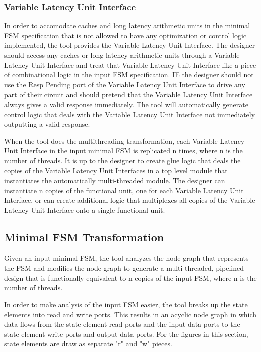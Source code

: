 \subsubsection{Variable Latency Unit Interface}
In order to accomodate caches and long latency arithmetic units in the minimal FSM specification that is not allowed to have any optimization or control logic implemented, the tool provides the Variable Latency Unit Interface. The designer should access any caches or long latency arithmetic units through a Variable Latency Unit Interface and treat that Variable Latency Unit Interface like a piece of combinational logic in the input FSM specification. IE the designer should not use the Resp Pending port of the Variable Latency Unit Interface to drive any part of their circuit and should pretend that the Variable Latency Unit Interface always gives a valid response immediately. The tool will automatically generate control logic that deals with the Variable Latency Unit Interface not immediately outputting a valid response.

When the tool does the multithreading transformation, each Variable Latency Unit Interface in the input minimal FSM is replicated n times, where n is the number of threads. It is up to the designer to create glue logic that deals the copies of the Variable Latency Unit Interfaces in a top level module that instantiates the automatically multi-threaded module. The designer can instantiate n copies of the functional unit, one for each Variable Latency Unit Interface, or can create additional logic that multiplexes all copies of the Variable Latency Unit Interface onto a single functional unit.

\subsection{Minimal FSM Transformation}
Given an input minimal FSM, the tool analyzes the node graph that represents the FSM and modifies the node graph to generate a multi-threaded, pipelined design that is functionally equivalent to n copies of the input FSM, where n is the number of threads.

In order to make analysis of the input FSM easier, the tool breaks up the state elements into read and write ports. This results in an acyclic node graph in which data flows from the state element read ports and the input data ports to the state element write ports and output data   ports. For the figures in this section, state elements are draw as separate "r" and "w" pieces.

